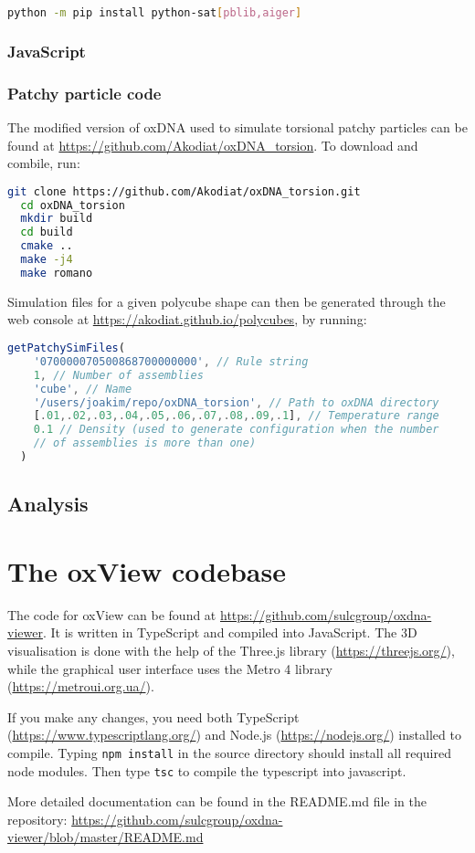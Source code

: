 \begin{lstlisting}[language=bash]
  python -m pip install python-sat[pblib,aiger]
\end{lstlisting}


\subsection{JavaScript}

\subsection{Patchy particle code}
\label{sec:appendix_patchy}
The modified version of oxDNA used to simulate torsional patchy particles can be found at \url{https://github.com/Akodiat/oxDNA_torsion}. To download and combile, run:

\begin{lstlisting}[language=bash]
  git clone https://github.com/Akodiat/oxDNA_torsion.git
  cd oxDNA_torsion
  mkdir build
  cd build
  cmake ..
  make -j4
  make romano
\end{lstlisting}

Simulation files for a given polycube shape can then be generated through the web console at \url{https://akodiat.github.io/polycubes}, by running:

\begin{lstlisting}[language=JavaScript]
  getPatchySimFiles(
    '070000070500868700000000', // Rule string
    1, // Number of assemblies
    'cube', // Name
    '/users/joakim/repo/oxDNA_torsion', // Path to oxDNA directory
    [.01,.02,.03,.04,.05,.06,.07,.08,.09,.1], // Temperature range
    0.1 // Density (used to generate configuration when the number
    // of assemblies is more than one)
  )
\end{lstlisting}


\section{Analysis}

\chapter{The oxView codebase}

The code for oxView can be found at \url{https://github.com/sulcgroup/oxdna-viewer}. It is written in TypeScript and compiled into JavaScript. The 3D visualisation is done with the help of the Three.js library (\url{https://threejs.org/}), while the graphical user interface uses the Metro 4 library (\url{https://metroui.org.ua/}). 

If you make any changes, you need both TypeScript (\url{https://www.typescriptlang.org/}) and Node.js (\url{https://nodejs.org/}) installed to compile. Typing \verb|npm install| in the source directory should install all required node modules. Then type \verb|tsc| to compile the typescript into javascript. 

More detailed documentation can be found in the README.md file in the repository: \url{https://github.com/sulcgroup/oxdna-viewer/blob/master/README.md}

\minitoc


